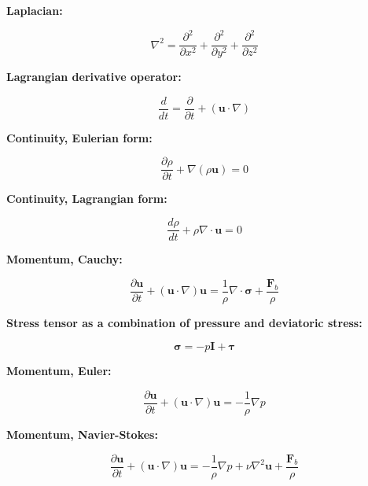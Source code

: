 \documentclass[12pt]{article}
\numberwithin{equation}{section}
\numberwithin{figure}{section}
\numberwithin{table}{section}
\begin{document}
\textbf{Laplacian:}

\begin{equation}
  \nabla^2 = \frac{\partial^2}{\partial x^2} + \frac{\partial^2}{\partial y^2} + \frac{\partial^2}{\partial z^2}
\end{equation}

\textbf{Lagrangian derivative operator:}
 
\begin{equation}
  \frac{d}{dt} = \frac{\partial}{\partial t} + (\mathbf{u} \cdot \nabla)
\end{equation}

\textbf{Continuity, Eulerian form:}

\begin{equation}
  \frac{\partial \rho}{\partial t} + \nabla (\rho \mathbf{u}) = 0
\end{equation}

\textbf{Continuity, Lagrangian form:}

\begin{equation}
  \frac{d\rho}{dt} + \rho \nabla \cdot \mathbf{u} = 0
\end{equation}

\textbf{Momentum, Cauchy:}

\begin{equation}
  \frac{\partial \mathbf{u}}{\partial t} + (\mathbf{u} \cdot \nabla) \mathbf{u} =
  \frac{1}{\rho} \nabla \cdot \boldsymbol{\sigma} + \frac{\mathbf{F}_b}{\rho}
\end{equation}

\textbf{Stress tensor as a combination of pressure and deviatoric stress:}

\begin{equation}
  \boldsymbol{\sigma} = -p \mathbf{I} + \boldsymbol{\tau}
\end{equation}

\textbf{Momentum, Euler:}

\begin{equation}
  \frac{\partial \mathbf{u}}{\partial t} + (\mathbf{u} \cdot \nabla) \mathbf{u} =
  - \frac{1}{\rho} \nabla p
\end{equation}

\textbf{Momentum, Navier-Stokes:}

\begin{equation}
  \frac{\partial \mathbf{u}}{\partial t} + (\mathbf{u} \cdot \nabla) \mathbf{u} =
  - \frac{1}{\rho} \nabla p + \nu \nabla^2 \mathbf{u} + \frac{\mathbf{F}_b}{\rho}
\end{equation}
\end{document}
